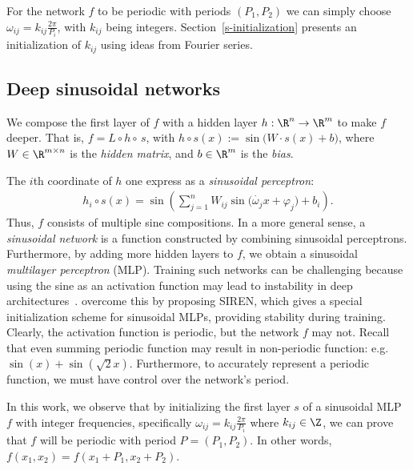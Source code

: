For the network $f$ to be periodic with periods $(P_1,P_2)$ we can simply choose $\omega_{ij}=k_{ij}\frac{2\pi}{P_i}$, with $k_{ij}$ being integers.
Section~\ref{s-initialization} presents an initialization of $k_{ij}$ using ideas from Fourier series.

\subsection{Deep sinusoidal networks}\label{s-deep-networks}

We compose the first layer of $f$ with a hidden layer $h:\R^{n}\to \R^{m}$ to make $f$ deeper.
That is,
$f=L\circ h \circ \,s$, 
with $h\circ s(x):=\sin\big(W \cdot s(x)+b\big)$, where $W\in\R^{m\times n}$ is the \textit{hidden matrix}, and $b\in\R^{m}$ is the \textit{bias}.


\noindent The $i$th coordinate of $h$ one express as a \textit{sinusoidal perceptron}:
%
\begin{align*}
h_{i}\circ s(x)=\sin\left(\sum_{j=1}^{n} W_{ij} \sin\Big(\dot{\omega_j}{x}+\varphi_j\Big) + b_{i}\right).
\end{align*}
%
Thus, $f$ consists of multiple sine compositions. In a more general sense, a \textit{sinusoidal network} is a function constructed by combining sinusoidal perceptrons.
%
Furthermore, by adding more hidden layers to $f$, we obtain a sinusoidal \textit{multilayer perceptron} (MLP). Training such networks can be challenging because using the sine as an activation function may lead to instability in deep architectures~\cite{taming2017}. \citet{sitzmann2019siren} overcome this by proposing SIREN, which gives a special initialization scheme for sinusoidal MLPs, providing stability during training.
Clearly, the activation function is periodic, but the network $f$ may not.
Recall that even summing periodic function may result in non-periodic function: e.g. $\sin(x)+\sin\left(\sqrt{2}x\right)$. 
Furthermore, to accurately represent a periodic function, we must have control over the network's period.



%
In this work, we observe that by initializing the first layer $s$ of a sinusoidal MLP $f$ with integer frequencies, specifically $\omega_{ij}=k_{ij}\frac{2\pi}{P_i}$ where $k_{ij}\in\Z$, we can prove that $f$ will be periodic with period $P=(P_1,P_{2})$.
In other words, $f(x_1, x_2)=f(x_1+P_1, x_2+P_2)$.

